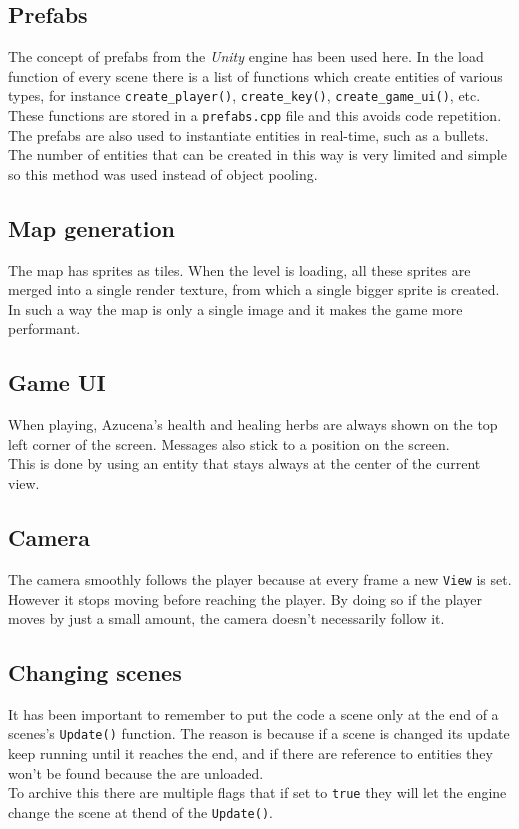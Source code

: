\documentclass[10pt, a4paper]{article}
\begin{document}
    \subsection{Prefabs}
    The concept of prefabs from the \textit{Unity} engine has been used here. In the load function of every scene there is a list of functions which create entities of various types, for instance \texttt{create\_player()}, \texttt{create\_key()}, \texttt{create\_game\_ui()}, etc. These functions are stored in a \texttt{prefabs.cpp} file and this avoids code repetition.\\
    The prefabs are also used to instantiate entities in real-time, such as a bullets. The number of entities that can be created in this way is very limited and simple so this method was used instead of object pooling.
    
    \subsection{Map generation}
    The map has sprites as tiles. When the level is loading, all these sprites are merged into a single render texture, from which a single bigger sprite is created. In such a way the map is only a single image and it makes the game more performant.
    
    \subsection{Game UI}
    When playing, Azucena’s health and healing herbs are always shown on the top left corner of the screen. Messages also stick to a position on the screen.\\
    This is done by using an entity that stays always at the center of the current view.
    
    \subsection{Camera}
    The camera smoothly follows the player because at every frame a new \texttt{View} is set. However it stops moving before reaching the player. By doing so if the player moves by just a small amount, the camera doesn't necessarily follow it.
    
    \subsection{Changing scenes}
    It has been important to remember to put the code a scene only at the end of a scenes's \texttt{Update()} function. The reason is because if a scene is changed its update keep running until it reaches the end, and if there are reference to entities they won't be found because the are unloaded.\\
    To archive this there are multiple flags that if set to \texttt{true} they will let the engine change the scene at thend of the \texttt{Update()}.
    
\end{document}
